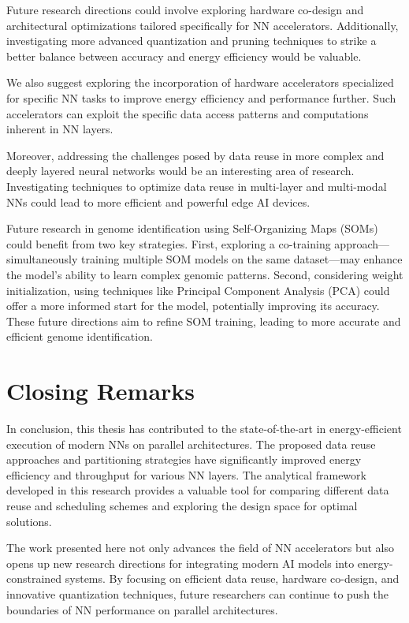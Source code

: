 Future research directions could involve exploring hardware co-design and architectural optimizations tailored specifically for NN accelerators. Additionally, investigating more advanced quantization and pruning techniques to strike a better balance between accuracy and energy efficiency would be valuable.

We also suggest exploring the incorporation of hardware accelerators specialized for specific NN tasks to improve energy efficiency and performance further. Such accelerators can exploit the specific data access patterns and computations inherent in NN layers.

Moreover, addressing the challenges posed by data reuse in more complex and deeply layered neural networks would be an interesting area of research. Investigating techniques to optimize data reuse in multi-layer and multi-modal NNs could lead to more efficient and powerful edge AI devices.

Future research in genome identification using Self-Organizing Maps (SOMs) could benefit from two key strategies. First, exploring a co-training approach—simultaneously training multiple SOM models on the same dataset—may enhance the model's ability to learn complex genomic patterns. Second, considering weight initialization, using techniques like Principal Component Analysis (PCA) could offer a more informed start for the model, potentially improving its accuracy. These future directions aim to refine SOM training, leading to more accurate and efficient genome identification.

\section{Closing Remarks}
In conclusion, this thesis has contributed to the state-of-the-art in energy-efficient execution of modern NNs on parallel architectures. The proposed data reuse approaches and partitioning strategies have significantly improved energy efficiency and throughput for various NN layers. The analytical framework developed in this research provides a valuable tool for comparing different data reuse and scheduling schemes and exploring the design space for optimal solutions.

The work presented here not only advances the field of NN accelerators but also opens up new research directions for integrating modern AI models into energy-constrained systems. By focusing on efficient data reuse, hardware co-design, and innovative quantization techniques, future researchers can continue to push the boundaries of NN performance on parallel architectures.
